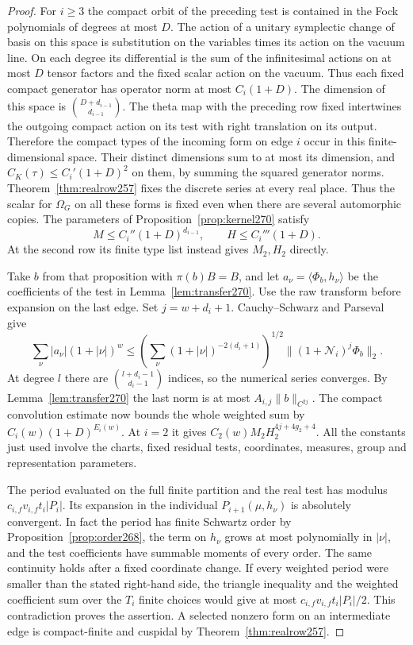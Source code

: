 \documentclass[a4paper,11pt]{article}
\theoremstyle{definition}
\theoremstyle{remark}
\numberwithin{equation}{section}
\begin{document}
\begin{proof}
For \(i\ge3\) the compact orbit of the preceding test is
contained in the Fock polynomials of degrees at most \(D\).
The action of a unitary symplectic change of basis on this
space is substitution on the variables times its action on
the vacuum line. On each degree its differential is the sum
of the infinitesimal actions on at most \(D\) tensor factors
and the fixed scalar action on the vacuum. Thus each fixed
compact generator has operator norm at most \(C_i(1+D)\).
The dimension of this space is \(\binom{D+d_{i-1}}{d_{i-1}}\).
The theta map with the preceding row fixed intertwines the
outgoing compact action on its test with right translation
on its output. Therefore the compact types of the incoming
form on edge \(i\) occur in this finite-dimensional space.
Their distinct dimensions sum to at most its dimension, and
\(C_K(\tau)\le C_i'(1+D)^2\) on them, by summing the squared
generator norms. Theorem~\ref{thm:realrow257} fixes the
discrete series at every real place. Thus the scalar for
\(\Omega_G\) on all these forms is fixed even when there
are several automorphic copies. The parameters of
Proposition~\ref{prop:kernel270} satisfy
\[
       M\le C_i''(1+D)^{d_{i-1}},\qquad H\le C_i'''(1+D).
\]
At the second row its finite type list instead gives
\(M_2,H_2\) directly.

Take \(b\) from that proposition with \(\pi(b)B=B\), and
let \(a_\nu=\langle\Phi_b,h_\nu\rangle\) be the coefficients
of the test in Lemma~\ref{lem:transfer270}. Use the raw
transform before expansion on the last edge. Set \(j=w+d_i+1\).
Cauchy--Schwarz and Parseval give
\[
   \sum_\nu |a_\nu|(1+|\nu|)^w
     \le \left(\sum_\nu(1+|\nu|)^{-2(d_i+1)}\right)^{1/2}
                  \|(1+\mathcal N_i)^j\Phi_b\|_2 .
\]
At degree \(l\) there are \(\binom{l+d_i-1}{d_i-1}\) indices,
so the numerical series converges.
By Lemma~\ref{lem:transfer270} the last norm is at most
\(A_{i,j}\|b\|_{C^{2j}}\).
The compact convolution estimate now bounds the whole
weighted sum by \(C_i(w)(1+D)^{E_i(w)}\). At \(i=2\) it
gives \(C_2(w)M_2 H_2^{4j+4g_2+4}\). All the constants just
used involve the charts, fixed residual tests, coordinates,
measures, group and representation parameters.

The period evaluated on the full finite partition and the
real test has modulus \(c_{i,f}v_{i,f}t_i|P_i|\).
Its expansion in the individual \(P_{i+1}(\mu,h_\nu)\) is
absolutely convergent. In fact the period has finite
Schwartz order by Proposition~\ref{prop:order268}, the term
on \(h_\nu\) grows at most polynomially in \(|\nu|\), and
the test coefficients have summable moments of every order.
The same continuity holds after a fixed coordinate change.
If every weighted period were smaller than the stated
right-hand side, the triangle inequality and the weighted
coefficient sum over the \(T_i\) finite choices would give
at most \(c_{i,f}v_{i,f}t_i|P_i|/2\). This contradiction
proves the assertion. A selected nonzero form on an
intermediate edge is compact-finite and cuspidal by
Theorem~\ref{thm:realrow257}.
\end{proof}
\end{document}
